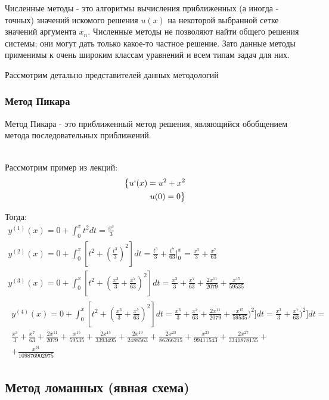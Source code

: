 \documentclass[12pt,a4paper]{scrartcl}
\begin{document}
	Численные методы - это алгоритмы вычисления приближенных (а иногда - точных) значений искомого решения $u(x)$ на некоторой выбранной сетке значений аргумента $x_n$. Численные методы не позволяют найти общего решения системы; они могут дать только какое-то частное решение. Зато данные методы применимы к очень широким классам уравнений и всем типам задач для них.
	
	Рассмотрим детально представителей данных методологий
	
	\subsubsection{Метод Пикара}
	
	Метод Пикара - это приближенный метод решения, являющийся обобщением метода последовательных приближений.
	
	\begin{align*}
	\end{align*}
	
	Рассмотрим пример из лекций:
	\begin{align*}
		\big \{ 
			u`(x) = u^2 + x^2\\
			u(0) = 0
		\big \}
	\end{align*}
	
	Тогда:
	\begin{gather*}
		y^{(1)}(x) = 0 + \int_{0}^{x} t^2dt = \frac{x^3}{3}\\
		y^{(2)}(x) = 0 + \int_{0}^{x}[t^2 + (\frac{t^3}{3})^2] dt = \frac{t^3}{3} + \frac{t^7}{63}|_{0}^x = \frac{x^3}{3} + \frac{x^7}{63}\\
		y^{(3)}(x) = 0 + \int_{0}^{x}[t^2 + (\frac{x^3}{3} + \frac{x^7}{63})^2]dt = \frac{x^3}{3} + \frac{x^7}{63} + \frac{2x^11}{2079} + \frac{x^{15}}{59535}\\
		\begin{align*}
			y^{(4)}(x) = 0 + \int_{0}^{x}[t^2 + (\frac{x^3}{3} + \frac{x^7}{63})^2]dt = \frac{x^3}{3} + \frac{x^7}{63} + \frac{2x^{11}}{2079} + \frac{x^{15}}{59535})^2]dt = \frac{x^3}{3} + \frac{x^7}{63})^2]dt = \\ \frac{x^3}{3} + \frac{x^7}{63} + \frac{2x^{11}}{2079} + \frac{x^{15}}{59535} + \frac{2x^{15}}{3393495} + \frac{2x^{19}}{2488563} + \frac{2x^{23}}{86266215} + \frac{x^23}{99411543} + \frac{2x^{27}}{3341878155}+ \\ + \frac{x^31 }{109876902975}
		\end{align*}
	\end{gather*}

	\subsection{Метод ломанных (явная схема)}
	
\end{document}
